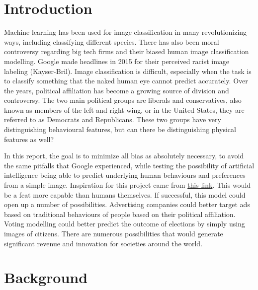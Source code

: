 \documentclass[manuscript,screen,review]{acmart}
\begin{document}

\maketitle

\section{Introduction}

Machine learning has been used for image classification in many revolutionizing ways, including classifying different species. There has also been moral controversy regarding big tech firms and their biased human image classification modelling. Google made headlines in 2015 for their perceived racist image labeling (Kayser-Bril). Image classification is difficult, especially when the task is to classify something that the naked human eye cannot predict accurately. Over the years, political affiliation has become a growing source of division and controversy. The two main political groups are liberals and conservatives, also known as members of the left and right wing, or in the United States, they are referred to as Democrats and Republicans. These two groups have very distinguishing behavioural features, but can there be distinguishing physical features as well?
\par
In this report, the goal is to minimize all bias as absolutely necessary, to avoid the same pitfalls that Google experienced, while testing the possibility of artificial intelligence being able to predict underlying human behaviours and preferences from a simple image. Inspiration for this project came from \href{ttps://www.nature.com/articles/s41598-020-79310-1 }{this link}. This would be a feat more capable than humans themselves. If successful, this model could open up a number of possibilities. Advertising companies could better target ads based on traditional behaviours of people based on their political affiliation. Voting modelling could better predict the outcome of elections by simply using images of citizens. There are numerous possibilities that would generate significant revenue and innovation for societies around the world.

\section{Background}
\end{document}
